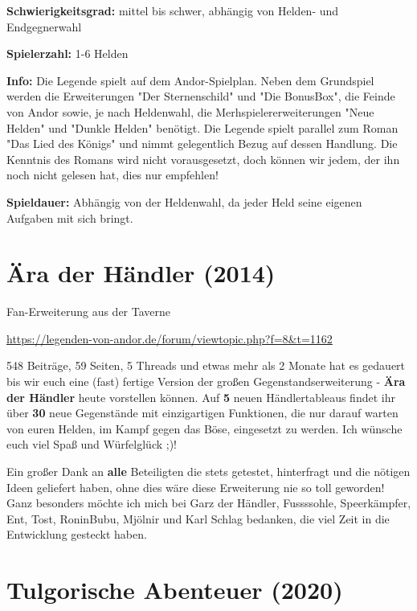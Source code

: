{\textbf{Schwierigkeitsgrad:}
mittel bis schwer, abhängig von Helden- und Endgegnerwahl

\textbf{Spielerzahl:} 1-6 Helden

\textbf{Info:}
Die Legende spielt auf dem Andor-Spielplan. Neben dem Grundspiel werden die Erweiterungen "Der Sternenschild" und "Die BonusBox", die Feinde von Andor sowie, je nach Heldenwahl, die Merhspielererweiterungen "Neue Helden" und "Dunkle Helden" benötigt.
Die Legende spielt parallel zum Roman "Das Lied des Königs" und nimmt gelegentlich Bezug auf dessen Handlung. Die Kenntnis des Romans wird nicht vorausgesetzt, doch können wir jedem, der ihn noch nicht gelesen hat, dies nur empfehlen!

\textbf{Spieldauer:}
Abhängig von der Heldenwahl, da jeder Held seine eigenen Aufgaben mit sich bringt.





\newpage
\section{Ära der Händler (2014)}

\begin{center}
    Fan-Erweiterung aus der Taverne

    \url{https://legenden-von-andor.de/forum/viewtopic.php?f=8&t=1162}
\end{center}


548 Beiträge, 59 Seiten, 5 Threads und etwas mehr als 2 Monate hat es gedauert bis wir euch eine (fast) fertige Version der großen Gegenstandserweiterung - \textbf{Ära der Händler} heute vorstellen können. Auf \textbf{5} neuen Händlertableaus findet ihr über \textbf{30} neue Gegenstände mit einzigartigen Funktionen, die nur darauf warten von euren Helden, im Kampf gegen das Böse, eingesetzt zu werden. Ich wünsche euch viel Spaß und Würfelglück ;)!

Ein großer Dank an \textbf{alle} Beteiligten die stets getestet, hinterfragt und die nötigen Ideen geliefert haben, ohne dies wäre diese Erweiterung nie so toll geworden!
Ganz besonders möchte ich mich bei Garz der Händler, Fussssohle, Speerkämpfer, Ent, Tost, RoninBubu, Mjölnir und Karl Schlag bedanken, die viel Zeit in die Entwicklung gesteckt haben.



\newpage
\section{Tulgorische Abenteuer (2020)}

}
